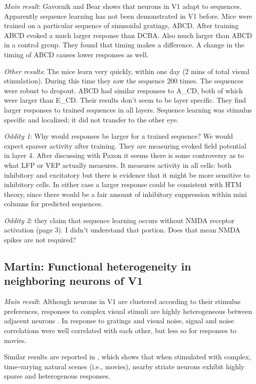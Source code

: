 \documentclass{article} %
\begin{document}
\emph{Main result}: Gavornik and Bear \cite{Gavornik2014} shows that neurons in
V1 adapt to sequences. Apparently sequence learning has not been demonstrated in
V1 before. Mice were trained on a particular sequence of sinusoidal gratings,
ABCD.  After training ABCD evoked a much larger response than DCBA. Also much
larger than ABCD in a control group.  They found that timing makes a difference.
A change in the timing of ABCD causes lower responses as well.

\emph{Other results}: The mice learn very quickly, within one day (2 mins of
total
visual stimulation). During this time they saw the sequence 200 times.  The
sequences were robust to dropout. ABCD had similar responses to A\_CD, both of
which were larger than E\_CD.  Their results don't seem to be layer specific.
They find larger responses to trained sequences in all layers.   Sequence
learning was stimulus specific and localized; it did not transfer to the other
eye.

\emph{Oddity 1}: Why would responses be larger for a trained sequence? We would
expect
sparser activity after training. They are measuring evoked field potential in
layer 4. After discussing with Paxon it seems there is some controversy as to
what LFP or VEP actually measures. It measures activity in all cells: both
inhibitory and excitatory but there is evidence that it might be more sensitive
to inhibitory cells.  In either case a larger response could be consistent with
HTM theory, since there would be a fair amount of inhibitory suppression within
mini columns for predicted sequences.

\emph{Oddity 2}: they claim that sequence learning occurs without NMDA receptor
activation (page 3). I didn't understand that portion. Does that mean NMDA
spikes are not required?

\subsection{Martin: Functional heterogeneity in neighboring neurons of V1}
 
\emph{Main result}: Although neurons in V1 are clustered according to their stimulus
 preferences, responses to complex visual stimuli are highly heterogeneous between 
 adjacent neurons \cite{Martin2013}. In response to gratings and visual noise, signal and noise 
 correlations were well correlated with each other, but less so for responses to movies. 
 
 Similar results are reported in \cite{Yen2007}, which shows that when stimulated with 
 complex, time-varying natural scenes (i.e., movies), nearby striate neurons exhibit highly 
 sparse and heterogenous responses.
 
\end{document}
